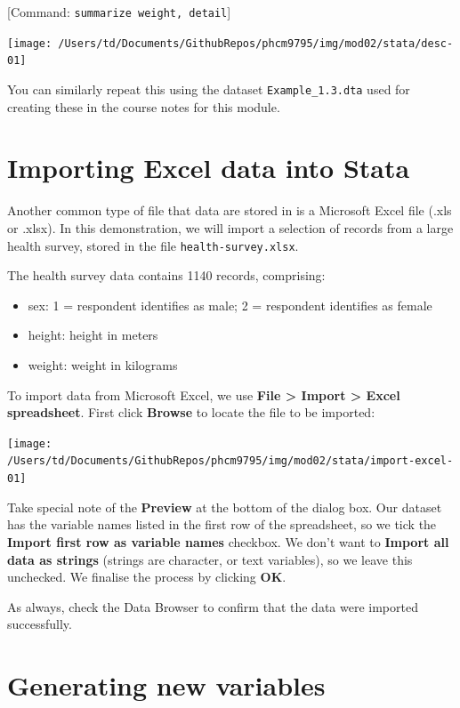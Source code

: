 \documentclass[
]{memoir}
\providecommand{\tightlist}{%
  \setlength{\itemsep}{0pt}\setlength{\parskip}{0pt}}
\begin{document}
{[}Command: \texttt{summarize\ weight,\ detail}{]}

\texttt{[image: /Users/td/Documents/GithubRepos/phcm9795/img/mod02/stata/desc-01]}

You can similarly repeat this using the dataset \texttt{Example\_1.3.dta} used for creating these in the course notes for this module.

\hypertarget{importing-excel-data-into-stata}{%
\section{Importing Excel data into Stata}\label{importing-excel-data-into-stata}}

Another common type of file that data are stored in is a Microsoft Excel file (.xls or .xlsx). In this demonstration, we will import a selection of records from a large health survey, stored in the file \texttt{health-survey.xlsx}.

The health survey data contains 1140 records, comprising:

\begin{itemize}
\tightlist
\item
  sex: 1 = respondent identifies as male; 2 = respondent identifies as female
\item
  height: height in meters
\item
  weight: weight in kilograms
\end{itemize}

To import data from Microsoft Excel, we use \textbf{File \textgreater{} Import \textgreater{} Excel spreadsheet}. First click \textbf{Browse} to locate the file to be imported:

\texttt{[image: /Users/td/Documents/GithubRepos/phcm9795/img/mod02/stata/import-excel-01]}

Take special note of the \textbf{Preview} at the bottom of the dialog box. Our dataset has the variable names listed in the first row of the spreadsheet, so we tick the \textbf{Import first row as variable names} checkbox. We don't want to \textbf{Import all data as strings} (strings are character, or text variables), so we leave this unchecked. We finalise the process by clicking \textbf{OK}.

As always, check the Data Browser to confirm that the data were imported successfully.

\hypertarget{generating-new-variables}{%
\section{Generating new variables}\label{generating-new-variables}}
\end{document}
